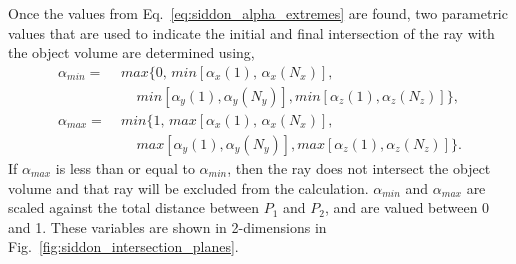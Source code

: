 Once the values from Eq.~\ref{eq:siddon_alpha_extremes} are found, two parametric values that are used to indicate the initial and final intersection of the ray with the object volume are determined using,
%
\begin{equation}
\begin{aligned}
\alpha_{min} = \; & max\{ 0, \, min \left[ \alpha_x(1), \, \alpha_x(N_x) \right], \\
               & \; \; \; \; min \left[ \alpha_y(1), \alpha_y(N_y) \right], min \left[ \alpha_z(1), \alpha_z (N_z) \right] \}, \\
\alpha_{max} = \; & min\{1, \, max \left[ \alpha_x(1), \, \alpha_x(N_x) \right], \\
			   & \; \; \; \; max \left[ \alpha_y(1), \alpha_y(N_y) \right], max \left[ \alpha_z(1), \alpha_z (N_z) \right] \}.
\end{aligned}
\label{eq:siddon_alpha_min_max}
\end{equation}
%
If $\alpha_{max}$ is less than or equal to $\alpha_{min}$, then the ray does not intersect the object volume and that ray will be excluded from the calculation.  $\alpha_{min}$ and $\alpha_{max}$ are scaled against the total distance between $P_1$ and $P_2$, and are valued between 0 and 1.  These variables are shown in 2-dimensions in Fig.~\ref{fig:siddon_intersection_planes}.


